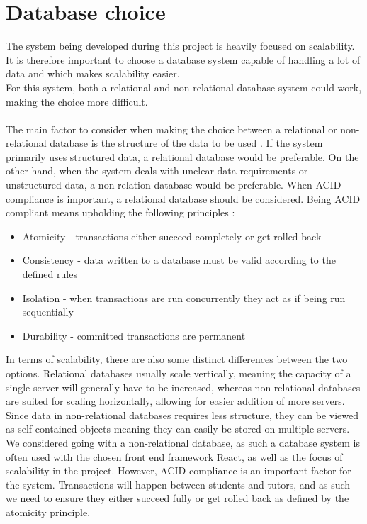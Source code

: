 \section{Database choice}
The system being developed during this project is heavily focused on scalability.
It is therefore important to choose a database system capable of handling a lot of data and which makes scalability easier.
\\
For this system, both a relational and non-relational database system could work, making the choice more difficult.
\\\\
The main factor to consider when making the choice between a relational or non-relational database is the structure of the data to be used \cite{sqlvsnosql}.
If the system primarily uses structured data, a relational database would be preferable.
On the other hand, when the system deals with unclear data requirements or unstructured data, a non-relation database would be preferable. 
When ACID compliance is important, a relational database should be considered.
Being ACID compliant means upholding the following principles \cite{sqlvsnosql}:
\begin{itemize}
    \item Atomicity - transactions either succeed completely or get rolled back
    \item Consistency - data written to a database must be valid according to the defined rules
    \item Isolation - when transactions are run concurrently they act as if being run sequentially
    \item Durability - committed transactions are permanent 
\end{itemize}
In terms of scalability, there are also some distinct differences between the two options. 
Relational databases usually scale vertically, meaning the capacity of a single server will generally have to be increased, whereas non-relational databases are suited for scaling horizontally, allowing for easier addition of more servers.
Since data in non-relational databases requires less structure, they can be viewed as self-contained objects meaning they can easily be stored on multiple servers.
We considered going with a non-relational database, as such a database system is often used with the chosen front end framework React, as well as the focus of scalability in the project.
However, ACID compliance is an important factor for the system.
Transactions will happen between students and tutors, and as such we need to ensure they either succeed fully or get rolled back as defined by the atomicity principle.
